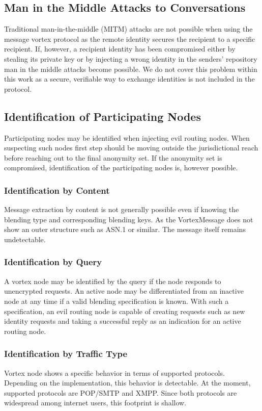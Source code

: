 \subsection{Man in the Middle Attacks to Conversations}
Traditional man-in-the-middle (MITM) attacks are not possible when using the message vortex protocol as the remote identity secures the recipient to a specific recipient. If, however, a recipient identity has been compromised either by stealing its private key or by injecting a wrong identity in the senders' repository man in the middle attacks become possible. We do not cover this problem within this work as a secure, verifiable way to exchange identities is not included in the protocol.

\subsection{Identification of Participating Nodes}
Participating nodes may be identified when injecting evil routing nodes. When suspecting such nodes first step should be moving outside the jurisdictional reach before reaching out to the final anonymity set. If the anonymity set is compromised, identification of the participating nodes is, however possible.

\subsubsection{Identification by Content}
Message extraction by content is not generally possible even if knowing the blending type and corresponding blending keys. As the VortexMessage does not show an outer structure such as ASN.1 or similar. The message itself remains undetectable.

\subsubsection{Identification by Query}
A vortex node may be identified by the query if the node responds to unencrypted requests. An active node may be differentiated from an inactive node at any time if a valid blending specification is known. With such a specification, an evil routing node is capable of creating requests such as new identity requests and taking a successful reply as an indication for an active routing node.

\subsubsection{Identification by Traffic Type}
Vortex node shows a specific behavior in terms of supported protocols. Depending on the implementation, this behavior is detectable. At the moment, supported protocols are POP/SMTP and XMPP. Since both protocols are widespread among internet users, this footprint is shallow.

